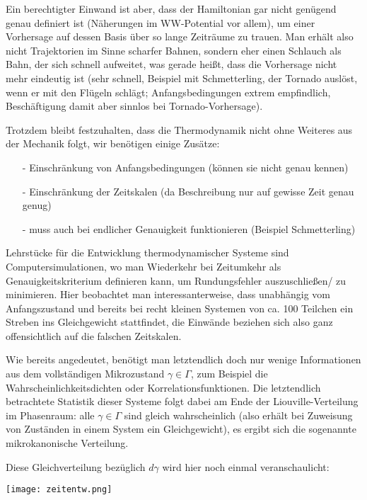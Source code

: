 \documentclass[../KlassMech_main.tex]{subfiles}
\begin{document}
Ein berechtigter Einwand ist aber, dass der Hamiltonian gar nicht genügend genau definiert ist (Näherungen im WW-Potential vor allem), um einer Vorhersage auf dessen Basis über so lange Zeiträume zu trauen. Man erhält also nicht Trajektorien im Sinne scharfer Bahnen, sondern eher einen Schlauch als Bahn, der sich schnell aufweitet, was gerade heißt, dass die Vorhersage nicht mehr eindeutig ist (sehr schnell, Beispiel mit Schmetterling, der Tornado auslöst, wenn er mit den Flügeln schlägt; Anfangsbedingungen extrem empfindlich, Beschäftigung damit aber sinnlos bei Tornado-Vorhersage).

Trotzdem bleibt festzuhalten, dass die Thermodynamik nicht ohne Weiteres aus der Mechanik folgt, wir benötigen einige Zusätze:
\begin{itemize}
\item[-] Einschränkung von Anfangsbedingungen (können sie nicht genau kennen)
\item[-] Einschränkung der Zeitskalen (da Beschreibung nur auf gewisse Zeit genau genug)
\item[-] muss auch bei endlicher Genauigkeit funktionieren (Beispiel Schmetterling)
\end{itemize}

Lehrstücke für die Entwicklung thermodynamischer Systeme sind Computersimulationen, wo man Wiederkehr bei Zeitumkehr als Genauigkeitskriterium definieren kann, um Rundungsfehler auszuschließen/ zu minimieren. Hier beobachtet man interessanterweise, dass unabhängig vom Anfangszustand und bereits bei recht kleinen Systemen von ca. 100 Teilchen ein Streben ins Gleichgewicht stattfindet, die Einwände beziehen sich also ganz offensichtlich auf die falschen Zeitskalen.

Wie bereits angedeutet, benötigt man letztendlich doch nur wenige Informationen aus dem vollständigen Mikrozustand $\gamma \in \Gamma$, zum Beispiel die Wahrscheinlichkeitsdichten oder Korrelationsfunktionen. Die letztendlich betrachtete Statistik dieser Systeme folgt dabei am Ende der Liouville-Verteilung im Phasenraum: alle $\gamma \in \Gamma$ sind gleich wahrscheinlich (also erhält bei Zuweisung von Zuständen in einem System ein Gleichgewicht), es ergibt sich die sogenannte mikrokanonische Verteilung.

Diese Gleichverteilung bezüglich $d\gamma$ wird hier noch einmal veranschaulicht:

\begin{center}
\texttt{[image: zeitentw.png]}
\label{fig:zeitentw}
\end{center}
\end{document}
